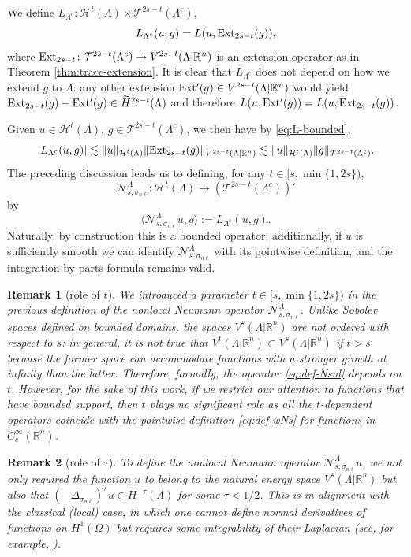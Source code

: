 \documentclass{amsart}
\newcommand{\domain}{\Lambda}
\newcommand{\snl}{{\sigma_{n\ell}}}
\def\calT{\mathcal{T}}
\def\calH{\mathcal{H}}
\def\R{{\mathbb R}}
\newcommand{\Nsnl}{\mathcal{N}_{s,\snl}}
\theoremstyle{plain}
\newtheorem{remark}{Remark}
\numberwithin{equation}{section}
\numberwithin{table}{section}
\numberwithin{figure}{section}
\numberwithin{theorem}{section}
\numberwithin{corollary}{section}
\numberwithin{definition}{section}
\numberwithin{lemma}{section}
\numberwithin{proposition}{section}
\numberwithin{remark}{section}
\begin{document}
We define $L_{\domain^c} \colon \mathcal{H}^t(\domain) \times \calT^{2s-t}(\domain^c)$,
\[
L_{\domain^c}(u,g) = L(u, {\rm Ext}_{2s-t}(g) ),
\]
where ${\rm Ext}_{2s-t}  \colon \calT^{2s-t}(\domain^c) \to  V^{2s-t}(\domain | \R^n)$ is an extension operator as in Theorem \ref{thm:trace-extension}. It is clear that $L_{\domain^c}$ does not depend on how we extend $g$ to $\domain$: any other extension ${\rm Ext'}(g) \in V^{2s-t}(\domain | \R^n)$ would yield ${\rm Ext}_{2s-t}(g) - {\rm Ext'}(g) \in \widetilde{H}^{2s-t}(\domain)$ and therefore $L(u,  {\rm Ext'}(g)) = L(u,  {\rm Ext}_{2s-t}(g))$.

Given $u \in \calH^t(\domain)$, $g \in \calT^{2s-t}(\domain^c)$, we then have by \eqref{eq:L-bounded},
\[
|L_{\domain^c}(u,g)| \lesssim \| u \|_{\mathcal{H}^t(\domain)}  \|  {\rm Ext}_{2s-t}(g) \|_{V^{2s-t}(\domain | \R^n)} \lesssim \| u \|_{\mathcal{H}^t(\domain) }  \| g \|_{ \calT^{2s-t}(\domain^c)}.
\]
The preceding discussion leads us to defining, for any $t \in [s, \min \{1, 2s\})$,
\[
\Nsnl^\domain \colon \mathcal{H}^t(\domain) \to \left( \calT^{2s-t}(\domain^c)\right)'
\]
by
\begin{equation} \label{eq:def-Nsnl}
\langle \Nsnl^\domain u, g \rangle := L_{\domain^c}(u,g).
\end{equation}
Naturally, by construction this is a bounded operator; additionally, if $u$ is sufficiently smooth we can identify $\Nsnl^\domain$ with its pointwise definition, and the integration by parts formula remains valid. 


\begin{remark}[role of $t$] We introduced a parameter $t \in  [s, \min \{1, 2s\})$ in the previous definition of the nonlocal Neumann operator $\Nsnl^\domain$. Unlike Sobolev spaces defined on bounded domains, the spaces $V^s(\domain|\R^n)$ are not ordered with respect to $s$: in general, it is not true that $V^t(\domain|\R^n) \subset V^s(\domain|\R^n)$ if $t > s$ because the former space can accommodate functions with a stronger growth at infinity than the latter. Therefore, formally, the operator \eqref{eq:def-Nsnl} depends on $t$. However, for the sake of this work, if we restrict our attention to functions that have bounded support, then $t$ plays no significant role as all the $t$-dependent operators coincide with the pointwise definition \eqref{eq:def-wNs} for functions in $C^\infty_c(\R^n)$.
\end{remark}

\begin{remark}[role of $\tau$]
To define the nonlocal Neumann operator $\Nsnl^\domain u$, we not only required the function $u$ to belong to the natural energy space $V^s(\domain | \R^n)$ but also that  $(-\Delta_\snl)^s u  \in H^{-\tau}(\domain)$ for some $\tau < 1/2$. This is in alignment with the classical (local) case, in which one cannot define normal derivatives of functions on $H^1(\Omega)$ but requires some integrability of their Laplacian (see, for example, \cite[Chap. 6]{Sayas-book}).
\end{remark}
\end{document}
